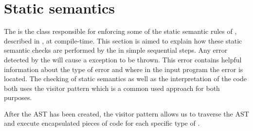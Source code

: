 \section{Static semantics}
The  is the class responsible for enforcing some of the static semantic rules of \productname{}, described in , at compile-time. This section is aimed to explain how these static semantic checks are performed by the  in simple sequential steps. Any error detected by the  will cause a  exception to be thrown. This error contains helpful information about the type of error and where in the input program the error is located. The checking of static semantics as well as the interpretation of the code both uses the visitor pattern which is a common used approach for both purposes.

After the AST has been created, the visitor pattern allows us to traverse the AST and execute encapsulated pieces of code for each specific type of . 


